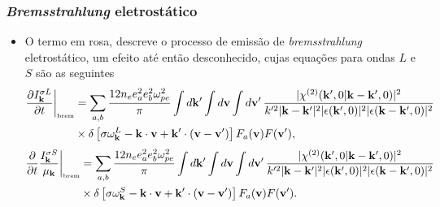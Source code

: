 \documentclass[10pt,aspectratio=1610,lualatex]{beamer}
\begin{document}
\begin{frame}
    \frametitle{\emph{Bremsstrahlung} eletrostático}
  \begin{itemize}
    \item O termo em rosa, descreve o processo de emissão de
    \emph{bremsstrahlung}  eletrostático, um efeito até então
    desconhecido, cujas equações para ondas $L$ e $S$ são
    as seguintes
    \vspace{0.3cm}
    \begin{equation*}
      \label{PkL,1}
      \begin{split}
	\frac{\partial I_{\bf k}^{\sigma L}}{\partial t}
	\biggr|_{\mbox{\tiny brem}}&=\sum_{a,b}
	\frac{12n_ee_a^2e_b^2\omega_{pe}^2}{\pi}\int d{\bf k}'
	\int d{\bf v}\int d{\bf v}'\,
	\frac{|\chi^{(2)}({\bf k}',0|{\bf k}-{\bf k}',0)|^2}
	{k'^2|{\bf k}-{\bf k}'|^2|\epsilon({\bf k}',0)|^2|
	  \epsilon({\bf k}-{\bf k}',0)|^2}\\
	&\times\delta\left[\sigma\omega_{\bf k}^L-{\bf k}\cdot
	  {\bf v}+{\bf k}'\cdot({\bf v}-{\bf v}')\right]
	F_a({\bf v})F({\bf v}'),\\
      \end{split}
    \end{equation*}
    \vspace{0.4cm}
    \begin{equation*}
      \label{PkS,1}
      \begin{split}
	\frac{\partial}{\partial t}
	\frac{I_{\bf k}^{\sigma S}}{\mu_{\bf k}}\biggr|_{\mbox{\tiny brem}}
	&=\sum_{a,b}\frac{12n_ee_a^2e_b^2\omega_{pe}^2}{\pi}
	\int d{\bf k}'\int d{\bf v}\int d{\bf v}'\,
	\frac{|\chi^{(2)}({\bf k}',0|{\bf k}-{\bf k}',0)|^2}
	{k'^2|{\bf k}-{\bf k}'|^2|\epsilon({\bf k}',0)|^2|
	  \epsilon({\bf k}-{\bf k}',0)|^2}\\
	&\times\delta\left[\sigma\omega_{\bf k}^S-{\bf k}
	  \cdot{\bf v}+{\bf k}'\cdot ({\bf v}-{\bf v}')\right]
	F_a({\bf v})F({\bf v}').
      \end{split}
    \end{equation*}
  \end{itemize}
\end{frame}
\end{document}
